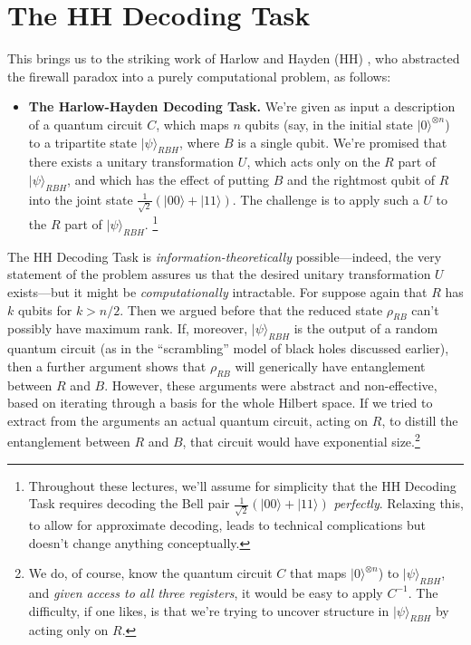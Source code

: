 \documentclass[11pt]{report}
\theoremstyle{plain}
\theoremstyle{definition}
\renewcommand{\ket}[1]{|#1\rangle}
\newcommand{\tensor}{\otimes}
\begin{document}
\section{The HH Decoding Task}

This brings us to the striking work of Harlow and Hayden (HH) \cite{harlowhayden}, who abstracted
the firewall paradox into a purely computational problem, as follows:

\begin{itemize}
\item \textbf{The Harlow-Hayden Decoding Task.}  We're given as input a description of a quantum circuit $C$, which
maps $n$ qubits (say, in the initial state $\ket{0}^{\tensor n}$) to a tripartite state $\ket{\psi}_{RBH}$, where $B$ is
a single qubit.  We're promised
that there exists a unitary transformation $U$, which acts only on the $R$ part of $\ket{\psi}_{RBH}$, and which has the effect
of putting $B$ and the rightmost qubit of $R$
into the joint state $\frac{1}{\sqrt{2}}(\ket{00}+\ket{11})$.  The challenge is to apply such a $U$ to the $R$ part of $\ket{\psi}_{RBH}$.
\footnote{Throughout these lectures, we'll assume for simplicity that the HH Decoding Task requires decoding the Bell pair $\frac{1}{\sqrt{2}}(\ket{00}+\ket{11})$ {\em perfectly}.  Relaxing this, to allow for approximate decoding, leads to technical complications but doesn't
change anything conceptually.}
\end{itemize}

The HH Decoding Task is {\em information-theoretically} possible---indeed, the very statement of the problem assures us that the desired unitary transformation $U$ exists---but it might be {\em computationally} intractable.  For suppose again that $R$ has $k$ qubits for $k>n/2$.  Then
we argued before that the reduced state $\rho_{RB}$ can't possibly have maximum rank.  If, moreover, $\ket{\psi}_{RBH}$ is the output of a random quantum circuit (as in the ``scrambling'' model of black holes discussed earlier), then a further argument shows that $\rho_{RB}$ will generically have entanglement between $R$ and $B$.  However, these arguments were abstract and non-effective, based on iterating through a basis for the whole Hilbert space.  If we tried to extract from the arguments an actual quantum circuit, acting on $R$, to distill the entanglement between $R$ and $B$, that circuit would have exponential size.\footnote{We do, of course, know the quantum circuit $C$ that maps $\ket{0}^{\tensor n}$) to $\ket{\psi}_{RBH}$, and {\em given access to all three registers}, it would be easy to apply $C^{-1}$.  The difficulty, if one likes, is that we're trying to uncover structure in $\ket{\psi}_{RBH}$ by acting only on $R$.}
\end{document}
